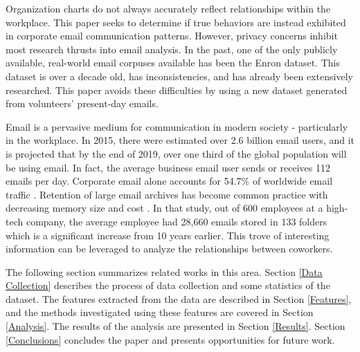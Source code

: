\documentclass{article}
\begin{document}
Organization charts do not always accurately reflect relationships within the workplace.  This paper seeks to determine if true behaviors are instead exhibited in corporate email communication patterns.  However, privacy concerns inhibit most research thrusts into email analysis.  In the past, one of the only publicly available, real-world email corpuses available has been the Enron dataset.  This dataset is over a decade old, has inconsistencies, and has already been extensively researched.  This paper avoids these difficulties by using a new dataset generated from volunteers' present-day emails.
\par
Email is a pervasive medium for communication in modern society - particularly in the workplace.  In 2015, there were estimated over 2.6 billion email users, and it is projected that by the end of 2019, over one third of the global population will be using email.  In fact, the average business email user sends or receives 112 emails per day.  Corporate email alone accounts for 54.7\% of worldwide email traffic \cite{radicati_emails_2015}. Retention of large email archives has become common practice with decreasing memory size and cost \cite{fisher_revisiting_2006}.  In that study, out of 600 employees at a high-tech company, the average employee had 28,660 emails stored in 133 folders which is a significant increase from 10 years earlier.  This trove of interesting information can be leveraged to analyze the relationships between coworkers.
\par
The following section summarizes related works in this area.  Section \ref{Data Collection} describes the process of data collection and some statistics of the dataset.  The features extracted from the data are described in Section \ref{Features}, and the methods investigated using these features are covered in Section \ref{Analysis}.  The results of the analysis are presented in Section \ref{Results}.  Section \ref{Conclusions} concludes the paper and presents opportunities for future work.  
\end{document}
